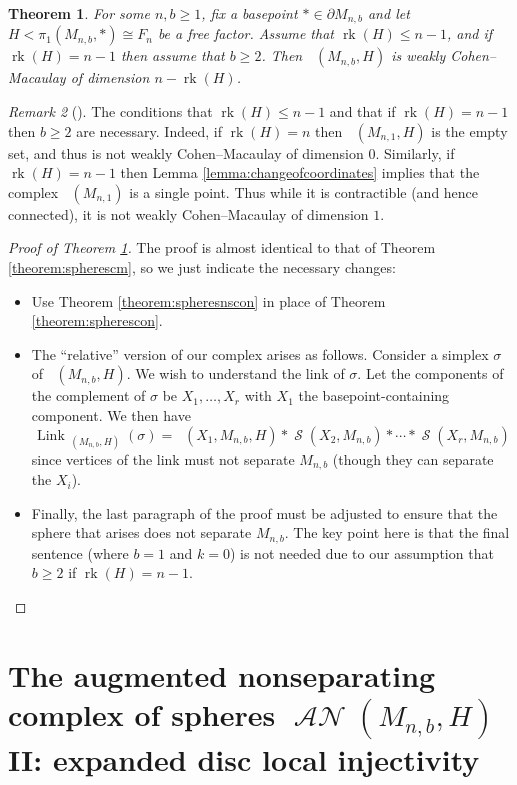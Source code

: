 \documentclass[11pt]{amsart}
\numberwithin{equation}{section}
\theoremstyle{plain}
\newtheorem{theorem}{Theorem}[section]
\theoremstyle{definition}
\theoremstyle{remark}
\newtheorem{rmk}[theorem]{Remark}
\newenvironment{remark}[1][]{\begin{rmk}[#1] \pushQED{\qed}}{\popQED \end{rmk}}
\DeclareMathOperator{\rank}{rk}
\DeclareMathOperator{\Spheres}{\mathcal{S}}
\DeclareMathOperator{\SpheresNS}{\Spheres_{\text{ns}}}
\DeclareMathOperator{\ANSpheres}{\mathcal{AN}}
\DeclareMathOperator{\Link}{Link}
\begin{document}
\begin{theorem}
\label{theorem:spheresnscm}
For some $n,b \geq 1$, fix a basepoint $\ast \in \partial M_{n,b}$
and let $H < \pi_1(M_{n,b},\ast) \cong F_n$ be a free factor.  Assume 
that $\rank(H) \leq n-1$, and if $\rank(H) = n-1$ then assume that $b \geq 2$.
Then $\SpheresNS(M_{n,b},H)$ is weakly Cohen--Macaulay of dimension $n-\rank(H)$.
\end{theorem}

\begin{remark}
The conditions that $\rank(H) \leq n-1$ and that if $\rank(H) = n-1$ then $b \geq 2$ are necessary.  Indeed, if $\rank(H) = n$ then
$\SpheresNS(M_{n,1},H)$ is the empty set, and thus is not weakly Cohen--Macaulay of dimension $0$.  Similarly,
if $\rank(H) = n-1$ then Lemma \ref{lemma:changeofcoordinates} implies that the
complex $\SpheresNS(M_{n,1})$ is a single point.  Thus while it is contractible (and hence connected), it
is not weakly Cohen--Macaulay of dimension $1$.
\end{remark}

\begin{proof}[Proof of Theorem \ref{theorem:spheresnscm}]
The proof is almost identical to that of Theorem \ref{theorem:spherescm}, so we just
indicate the necessary changes:
\begin{itemize}
\item Use Theorem \ref{theorem:spheresnscon} in place of Theorem \ref{theorem:spherescon}.
\item The ``relative'' version of our complex arises as follows.  Consider a simplex $\sigma$
of $\SpheresNS(M_{n,b},H)$.  We wish to understand the link of $\sigma$.  Let
the components of the complement of $\sigma$ be $X_1,\ldots,X_r$ with $X_1$ the basepoint-containing component.
We then have
\[\Link_{\SpheresNS(M_{n,b},H)}(\sigma) = \SpheresNS(X_1,M_{n,b},H) \ast \Spheres(X_2,M_{n,b}) \ast \cdots \ast \Spheres(X_r,M_{n,b})\]
since vertices of the link must not separate $M_{n,b}$ (though they can separate the $X_i$).
\item Finally, the last paragraph of the proof must be adjusted to ensure that the sphere
that arises does not separate $M_{n,b}$.  The key point here is that the final sentence (where
$b=1$ and $k=0$) is not needed due to our assumption that $b \geq 2$ if $\rank(H) = n-1$.\qedhere
\end{itemize}
\end{proof}

\section{The augmented nonseparating complex of spheres \texorpdfstring{$\ANSpheres(M_{n,b},H)$}{AN(M,H)} II: expanded disc local injectivity}
\label{section:augmenteddiscunred}
\end{document}
